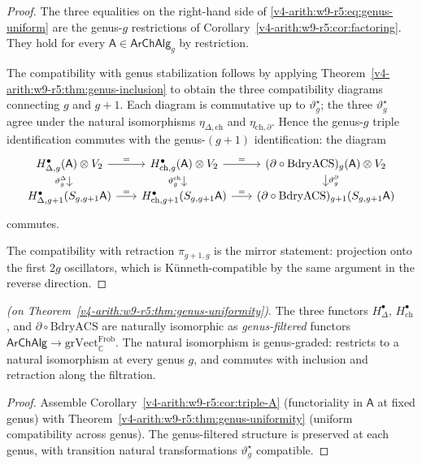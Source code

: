 \begin{proof}
The three equalities on the right-hand side of
\eqref{v4-arith:w9-r5:eq:genus-uniform} are the genus-\(g\) restrictions
of Corollary~\ref{v4-arith:w9-r5:cor:factoring}. They hold for every
\(\mathsf{A}\in\mathsf{ArChAlg}_{g}\) by restriction.

The compatibility with genus stabilization follows by applying
Theorem~\ref{v4-arith:w9-r5:thm:genus-inclusion} to obtain the three
compatibility diagrams connecting \(g\) and \(g+1\). Each diagram is
commutative up to \(\vartheta^{\star}_{g}\); the three
\(\vartheta^{\star}_{g}\) agree under the natural isomorphisms
\(\eta_{\Delta,\mathrm{ch}}\) and \(\eta_{\mathrm{ch},\partial}\). Hence
the genus-\(g\) triple identification commutes with the genus-\((g+1)\)
identification: the diagram
\[
\begin{tikzcd}[column sep=scriptsize, row sep=small]
H^{\bullet}_{\Delta,g}(\mathsf{A})\otimes V_{2}\arrow[r,"="]\arrow[d,"\vartheta^{\Delta}_{g}"']
&H^{\bullet}_{\mathrm{ch},g}(\mathsf{A})\otimes V_{2}\arrow[r,"="]\arrow[d,"\vartheta^{\mathrm{ch}}_{g}"']
&(\partial\circ\mathrm{BdryACS})_{g}(\mathsf{A})\otimes V_{2}\arrow[d,"\vartheta^{\partial}_{g}"]\\
H^{\bullet}_{\Delta,g+1}(S_{g,g+1}\mathsf{A})\arrow[r,"="]
&H^{\bullet}_{\mathrm{ch},g+1}(S_{g,g+1}\mathsf{A})\arrow[r,"="]
&(\partial\circ\mathrm{BdryACS})_{g+1}(S_{g,g+1}\mathsf{A})
\end{tikzcd}
\]
commutes.

The compatibility with retraction \(\pi_{g+1,g}\) is the mirror
statement: projection onto the first \(2g\) oscillators, which is
K\"unneth-compatible by the same argument in the reverse direction.
\end{proof}

\begin{corollary}
\label{v4-arith:w9-r5:cor:all-genus-triple}
\ClaimStatusProvedHereConditional \emph{(on
Theorem~\ref{v4-arith:w9-r5:thm:genus-uniformity})}. The three functors
\(H^{\bullet}_{\Delta}\), \(H^{\bullet}_{\mathrm{ch}}\), and
\(\partial\circ\mathrm{BdryACS}\) are naturally isomorphic as
\emph{genus-filtered} functors
\(\mathsf{ArChAlg}\to\mathrm{grVect}_{\mathbb{C}}^{\mathrm{Frob}}\).
The natural isomorphism is genus-graded: restricts to a natural
isomorphism at every genus \(g\), and commutes with inclusion and
retraction along the filtration.
\end{corollary}

\begin{proof}
Assemble Corollary~\ref{v4-arith:w9-r5:cor:triple-A} (functoriality in
\(\mathsf{A}\) at fixed genus) with
Theorem~\ref{v4-arith:w9-r5:thm:genus-uniformity} (uniform compatibility
across genus). The genus-filtered structure is preserved at each
genus, with transition natural transformations \(\vartheta^{\star}_{g}\)
compatible.
\end{proof}

